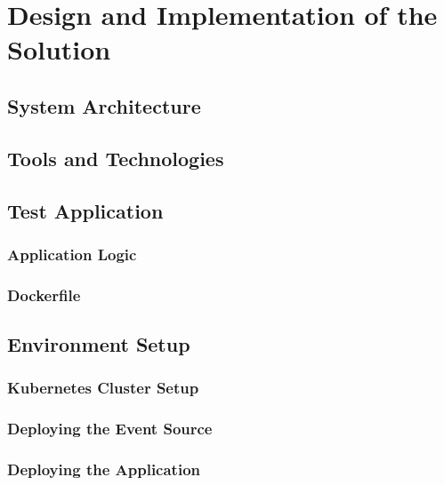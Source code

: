 \chapter{Design and Implementation of the Solution}
\label{cha:solution_design}

\section{System Architecture}

\section{Tools and Technologies}

\section{Test Application}
\subsection{Application Logic}
\subsection{Dockerfile}

\section{Environment Setup}
\subsection{Kubernetes Cluster Setup}
\subsection{Deploying the Event Source}
\subsection{Deploying the Application}

